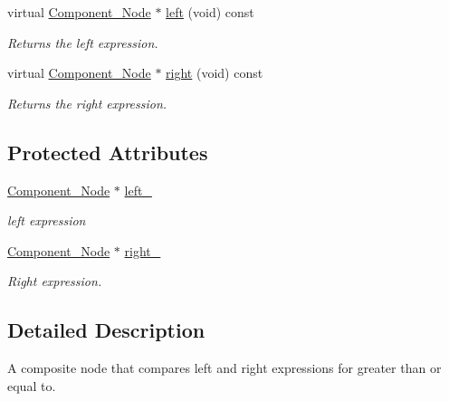 \begin{DoxyCompactItemize}
virtual \hyperlink{classMadara_1_1Expression__Tree_1_1Component__Node}{Component\_\-Node} $\ast$ \hyperlink{classMadara_1_1Expression__Tree_1_1Composite__Binary__Node_a6ca5cccbc46ccc6026c18f9665298380}{left} (void) const 
\begin{DoxyCompactList}\small\item\em Returns the left expression. \item\end{DoxyCompactList}\item 
virtual \hyperlink{classMadara_1_1Expression__Tree_1_1Component__Node}{Component\_\-Node} $\ast$ \hyperlink{classMadara_1_1Expression__Tree_1_1Composite__Unary__Node_ade55cde5707e0fa73ab1c019159b9aec}{right} (void) const 
\begin{DoxyCompactList}\small\item\em Returns the right expression. \item\end{DoxyCompactList}\end{DoxyCompactItemize}
\subsection*{Protected Attributes}
\begin{DoxyCompactItemize}
\item 
\hyperlink{classMadara_1_1Expression__Tree_1_1Component__Node}{Component\_\-Node} $\ast$ \hyperlink{classMadara_1_1Expression__Tree_1_1Composite__Binary__Node_acac60a70beb2484737e6e7161edb2d1b}{left\_\-}
\begin{DoxyCompactList}\small\item\em left expression \item\end{DoxyCompactList}\item 
\hyperlink{classMadara_1_1Expression__Tree_1_1Component__Node}{Component\_\-Node} $\ast$ \hyperlink{classMadara_1_1Expression__Tree_1_1Composite__Unary__Node_a077b7bd1b52df6f5c6adfde735556a68}{right\_\-}
\begin{DoxyCompactList}\small\item\em Right expression. \item\end{DoxyCompactList}\end{DoxyCompactItemize}


\subsection{Detailed Description}
A composite node that compares left and right expressions for greater than or equal to. 

